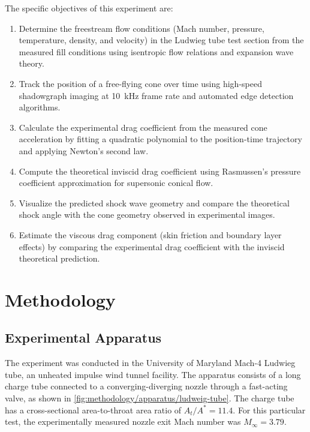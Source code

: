 The specific objectives of this experiment are:
\begin{enumerate}
    \item Determine the freestream flow conditions (Mach number, pressure, temperature, density, and velocity) in the Ludwieg tube test section from the measured fill conditions using isentropic flow relations and expansion wave theory.

    \item Track the position of a free-flying cone over time using high-speed shadowgraph imaging at \qty{10}{kHz} frame rate and automated edge detection algorithms.

    \item Calculate the experimental drag coefficient from the measured cone acceleration by fitting a quadratic polynomial to the position-time trajectory and applying Newton's second law.

    \item Compute the theoretical inviscid drag coefficient using Rasmussen's pressure coefficient approximation for supersonic conical flow.

    \item Visualize the predicted shock wave geometry and compare the theoretical shock angle with the cone geometry observed in experimental images.

    \item Estimate the viscous drag component (skin friction and boundary layer effects) by comparing the experimental drag coefficient with the inviscid theoretical prediction.
\end{enumerate}

\section{Methodology} \label{sec:methodology}

\subsection{Experimental Apparatus} \label{sec:methodology/apparatus}

The experiment was conducted in the University of Maryland Mach-4 Ludwieg tube, an unheated impulse wind tunnel facility. The apparatus consists of a long charge tube connected to a converging-diverging nozzle through a fast-acting valve, as shown in \cref{fig:methodology/apparatus/ludweig-tube}. The charge tube has a cross-sectional area-to-throat area ratio of $A_t/A^* = 11.4$. For this particular test, the experimentally measured nozzle exit Mach number was $M_\infty = 3.79$.

